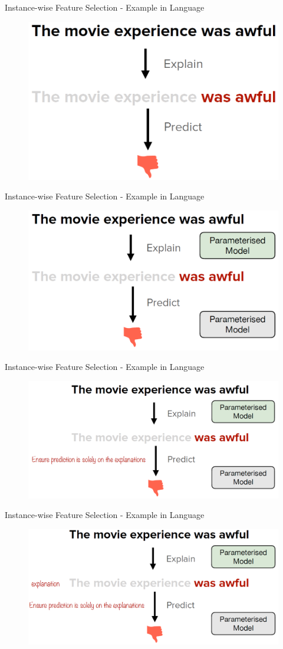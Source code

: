 \documentclass[11pt,compress,t,notes=noshow, aspectratio=169, xcolor=table]{beamer}
\begin{document}
\begin{frame}{Instance-wise Feature Selection - Example in Language}
    \begin{figure}
    \includegraphics[width=0.6\linewidth]{bild9}
    \end{figure}
\end{frame}

\begin{frame}{Instance-wise Feature Selection - Example in Language}
    \begin{figure}
    \includegraphics[width=0.6\linewidth]{bild10}
    \end{figure}
\end{frame}

\begin{frame}{Instance-wise Feature Selection - Example in Language}
    \begin{figure}
    \includegraphics[width=0.6\linewidth]{bild11}
    \end{figure}
\end{frame}

\begin{frame}{Instance-wise Feature Selection - Example in Language}
    \begin{figure}
    \includegraphics[width=0.6\linewidth]{bild12}
    \end{figure}
\end{frame}
\end{document}
